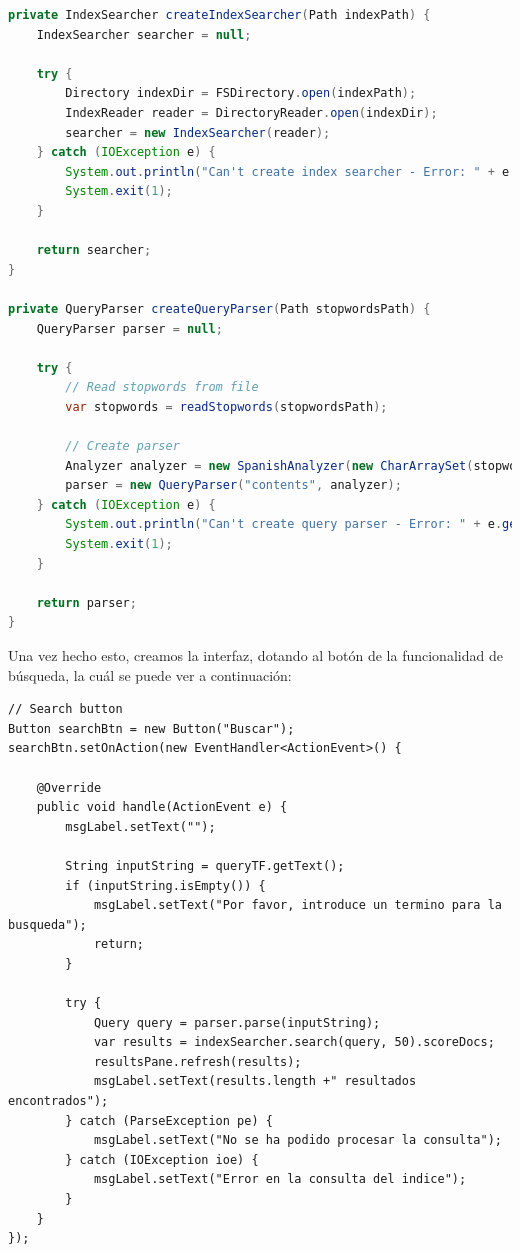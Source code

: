 \begin{lstlisting}[language=Java]
private IndexSearcher createIndexSearcher(Path indexPath) {
    IndexSearcher searcher = null;

    try {
        Directory indexDir = FSDirectory.open(indexPath);
        IndexReader reader = DirectoryReader.open(indexDir);
        searcher = new IndexSearcher(reader);
    } catch (IOException e) {
        System.out.println("Can't create index searcher - Error: " + e.getMessage());
        System.exit(1);
    }

    return searcher;
}

private QueryParser createQueryParser(Path stopwordsPath) {
    QueryParser parser = null;

    try {
        // Read stopwords from file
        var stopwords = readStopwords(stopwordsPath);

        // Create parser
        Analyzer analyzer = new SpanishAnalyzer(new CharArraySet(stopwords, true));
        parser = new QueryParser("contents", analyzer);
    } catch (IOException e) {
        System.out.println("Can't create query parser - Error: " + e.getMessage());
        System.exit(1);
    }

    return parser;
}
\end{lstlisting}

Una vez hecho esto, creamos la interfaz, dotando al botón de la funcionalidad de búsqueda, la cuál se puede ver a continuación:

\begin{lstlisting}
// Search button
Button searchBtn = new Button("Buscar");
searchBtn.setOnAction(new EventHandler<ActionEvent>() {

    @Override
    public void handle(ActionEvent e) {
        msgLabel.setText("");

        String inputString = queryTF.getText();
        if (inputString.isEmpty()) {
            msgLabel.setText("Por favor, introduce un termino para la busqueda");
            return;
        }

        try {
            Query query = parser.parse(inputString);
            var results = indexSearcher.search(query, 50).scoreDocs;
            resultsPane.refresh(results);
            msgLabel.setText(results.length +" resultados encontrados");
        } catch (ParseException pe) {
            msgLabel.setText("No se ha podido procesar la consulta");
        } catch (IOException ioe) {
            msgLabel.setText("Error en la consulta del indice");
        }
    }
});
\end{lstlisting}

